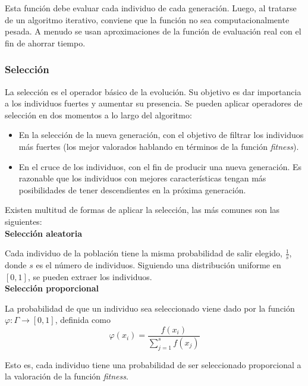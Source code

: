 			Esta funci\'on debe evaluar cada individuo de cada generaci\'on. Luego, al tratarse de un algoritmo iterativo, conviene que la funci\'on no sea computacionalmente pesada. A menudo se usan aproximaciones de la funci\'on de evaluaci\'on real con el fin de ahorrar tiempo.\\
		
			\subsubsection{Selecci\'on}
			La selecci\'on es el operador b\'asico de la evoluci\'on. Su objetivo es dar importancia a los individuos fuertes y aumentar su presencia. Se pueden aplicar operadores de selecci\'on en dos momentos a lo largo del algoritmo:\\
			
			\begin{itemize}
				\item En la selecci\'on de la nueva generaci\'on, con el objetivo de filtrar los individuos m\'as fuertes (los mejor valorados hablando en t\'erminos de la funci\'on \textit{fitness}).
				\item En el cruce de los individuos, con el fin de producir una nueva generaci\'on. Es razonable que los individuos con mejores caracter\'isticas tengan m\'as posibilidades de tener descendientes en la pr\'oxima generaci\'on.
			\end{itemize}
			
			\hspace{0.25cm}Existen multitud de formas de aplicar la selecci\'on, las m\'as comunes son las siguientes:\\
			
			\textbf{Selecci\'on aleatoria}
			
			Cada individuo de la poblaci\'on tiene la misma probabilidad de salir elegido, $\frac{1}{s}$, donde $s$ es el n\'umero de individuos. Siguiendo una distribuci\'on uniforme en $[0,1]$, se pueden extraer los individuos.\\
			
			\textbf{Selecci\'on proporcional}
			
			La probabilidad de que un individuo sea seleccionado viene dado por la funci\'on $\varphi:\Gamma\rightarrow [0,1]$, definida como
			\[\varphi(x_i)=\frac{f(x_i)}{\sum\limits_{j=1}^{s}f(x_j)}\]
			
			Esto es, cada individuo tiene una probabilidad de ser seleccionado proporcional a la valoraci\'on de la funci\'on \textit{fitness}.\\
			
